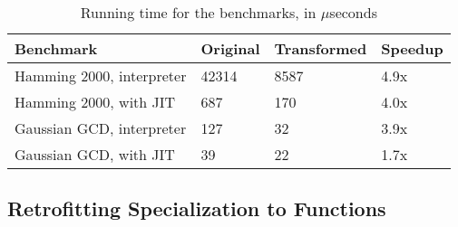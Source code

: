 \begin{table}
  \begin{tabularx}{\textwidth}{|g *{3}{|Y}|} \hline
    \textbf{Benchmark}        &  \textbf{Original}  & \textbf{Transformed} &      \textbf{Speedup} \\ \hline
    Hamming 2000, interpreter &                    42314 &                     8587 &                   4.9x \\
    Hamming 2000, with JIT    &                      687 &                      170 &                   4.0x \\
    Gaussian GCD, interpreter &                      127 &                       32 &                   3.9x \\
    Gaussian GCD, with JIT    &                       39 &                       22 &                   1.7x \\ \hline
  \end{tabularx}
  \caption{Running time for the benchmarks, in $\mu$seconds}
  \label{table:adrt}
  \vspace{-10mm}
\end{table}

\subsection{Retrofitting Specialization to Functions}
\label{sec:benchmarks:funcs}











